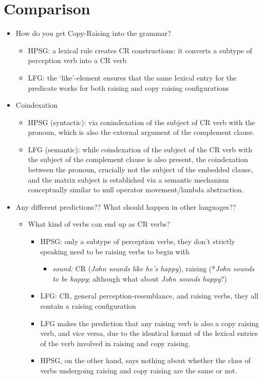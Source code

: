 \documentclass[11pt]{article}
\begin{document}
\section{Comparison}
\begin{itemize}
  \item How do you get Copy-Raising into the grammar? \begin{itemize}
      \item HPSG: a lexical rule creates CR constructions: it converts a subtype of perception verb into a CR verb
      \item LFG: the `like'-element ensures that the same lexical entry for the predicate works for both raising and copy raising configurations
    \end{itemize}

  \item Coindexation 
    \begin{itemize}
      \item HPSG (syntactic): via conindexation of the subject of CR verb with the pronoun, which is also the external argument of the complement clause.
      \item LFG (semantic): while coindexation of the subject of the CR verb with the subject of the complement clause is also present, the coindexation between the pronoun, crucially not the subject of the embedded clause, and the matrix subject is established via a semantic mechanism conceptually similar to null operator movement/lambda abstraction.
    \end{itemize}


  \item Any different predictions?? What should happen in other languages?? 
    \begin{itemize}
      \item  What kind of verbs can end up as CR verbs? 
        \begin{itemize}
          \item HPSG: only a subtype of perception verbs, they don't strictly speaking need to be raising verbs to begin with \begin{itemize}
              \item \textit{sound:}  CR (\textit{John sounds like he's happy}),  raising (*\textit{John sounds to be happy}; although what about \textit{John sounds happy}?)
            \end{itemize}

          \item LFG: CR, general perception-resemblance, and raising verbs, they all contain a raising configuration
          \item LFG makes the prediction that any raising verb is also a copy raising verb, and vice versa, due to the identical format of the lexical entries of the verb involved in raising and copy raising.
          \item HPSG, on the other hand, says nothing about whether the class of verbs undergoing raising and copy raising are the same or not.
        \end{itemize}


\end{itemize}
\end{itemize}
\end{document}
